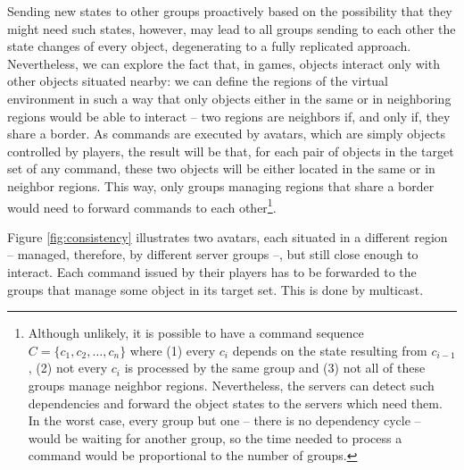 \documentclass[]{usiinfprospectus}
\begin{document}
Sending new states to other groups proactively based on the possibility that they might need such states, however, may lead to all groups sending to each other the state changes of every object, degenerating to a fully replicated approach. Nevertheless, we can explore the fact that, in games, objects interact only with other objects situated nearby: we can define the regions of the virtual environment in such a way that only objects either in the same or in neighboring regions would be able to interact -- two regions are neighbors if, and only if, they share a border. As commands are executed by avatars, which are simply objects controlled by players, the result will be that, for each pair of objects in the target set of any command, these two objects will be either located in the same or in neighbor regions. This way, only groups managing regions that share a border would need to forward commands to each other\footnote{Although unlikely, it is possible to have a command sequence $C = \{c_1,c_2,\ldots,c_n\}$ where (1) every $c_i$ depends on the state resulting from $c_{i-1}$, (2) not every $c_i$ is processed by the same group and (3) not all of these groups manage neighbor regions. Nevertheless, the servers can detect such dependencies and forward the object states to the servers which need them. In the worst case, every group but one -- there is no dependency cycle -- would be waiting for another group, so the time needed to process a command would be proportional to the number of groups.}.

Figure \ref{fig:consistency} illustrates two avatars, each situated in a different region -- managed, therefore, by different server groups --, but still close enough to interact. Each command issued by their players has to be forwarded to the groups that manage some object in its target set. This is done by multicast.

\end{document}
